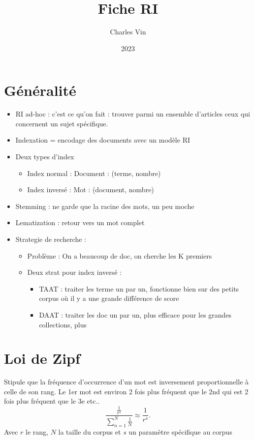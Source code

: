 \documentclass{article}
\title{Fiche RI}
\author{Charles Vin}
\date{2023}
\theoremstyle{plain}%
\theoremstyle{definition}
\theoremstyle{remark}
\begin{document}
\maketitle

\section{Généralité}
\begin{itemize}
    \item RI ad-hoc : c'est ce qu'on fait : trouver parmi un ensemble d'articles ceux qui concernent un sujet spécifique.
    \item Indexation = encodage des documents avec un modèle RI
    \item Deux types d'index \begin{itemize}
        \item Index normal : Document : (terme, nombre)
        \item Index inversé : Mot : (document, nombre)
    \end{itemize}
    \item Stemming : ne garde que la racine des mots, un peu moche 
    \item Lematization : retour vers un mot complet
    \item Strategie de recherche : \begin{itemize}
        \item Problème : On a beaucoup de doc, on cherche les K premiers
        \item Deux strat  pour index inversé : \begin{itemize}
            \item TAAT : traiter les terme un par un, fonctionne bien sur des petits corpus où il y a une grande différence de score
            \item DAAT : traiter les doc un par un, plus efficace pour les grandes collections, plus 
        \end{itemize}
    \end{itemize}
\end{itemize}



\section{Loi de Zipf}
Stipule que la fréquence d'occurrence d'un mot est inversement proportionnelle à celle de son rang. Le 1er mot est environ 2 fois plus fréquent que le 2nd qui est 2 fois plus fréquent que le 3e etc.. 
\[
    \frac{ \frac{1 }{r^s}}{ \sum_{n=1}^{N} \frac{1}{N}} \approx \frac{1}{r^s}
.\]
Avec $ r $ le rang, $ N $ la taille du corpus et $ s $ un paramètre spécifique au corpus
\end{document}
